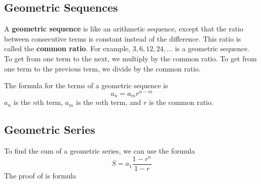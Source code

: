 \documentclass{article}
\begin{document}
    \subsection*{Geometric Sequences}
    A \textbf{geometric sequence} is like an arithmetic sequence, except that
    the ratio between consecutive terms is constant instead of the difference.
    This ratio is called the \textbf{common ratio}. For example, $3, 6, 12, 24,
    \dots$ is a geometric sequence. To get from one term to the next, we
    multiply by the common ratio. To get from one term to the previous term, we
    divide by the common ratio.

    The formula for the terms of a geometric sequence is
    \[a_n = a_mr^{n - m}\] $a_n$ is the $n$th term, $a_m$ is the $m$th term, and
    $r$ is the common ratio.
    \subsection*{Geometric Series}
    To find the sum of a geometric series, we can use the formula
    \[S = a_1\frac{1 - r^n}{1 - r}\]
    The proof of is formula
\end{document}

